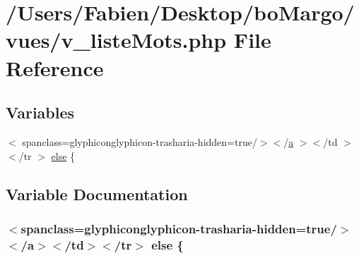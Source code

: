 \hypertarget{v__liste_mots_8php}{}\section{/\+Users/\+Fabien/\+Desktop/bo\+Margo/vues/v\+\_\+liste\+Mots.php File Reference}
\label{v__liste_mots_8php}
\subsection*{Variables}
\begin{DoxyCompactItemize}
\item 
$<$ spanclass=\textquotesingle{}glyphiconglyphicon-\/trash\textquotesingle{}aria-\/hidden=\textquotesingle{}true\textquotesingle{}/$>$$<$/\hyperlink{bootstrap_8min_8js_a1f5870dcf487187f13d5fd328ed9e6e7}{a} $>$$<$/td $>$$<$/tr $>$ \hyperlink{v__liste_mots_8php_a0f60a1e9f6ad9f3354da435468453884}{else} \{
\end{DoxyCompactItemize}


\subsection{Variable Documentation}
\hypertarget{v__liste_mots_8php_a0f60a1e9f6ad9f3354da435468453884}{}
\subsubsection[{else}]{\setlength{\rightskip}{0pt plus 5cm}$<$spanclass=\textquotesingle{}glyphiconglyphicon-\/trash\textquotesingle{}aria-\/hidden=\textquotesingle{}true\textquotesingle{}/$>$$<$/{\bf a}$>$$<$/td$>$$<$/tr$>$ else \{}\label{v__liste_mots_8php_a0f60a1e9f6ad9f3354da435468453884}
